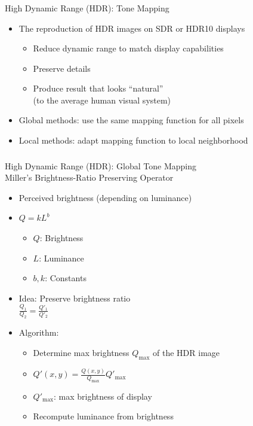 \documentclass[utf8,stillsansserifmath,fleqn,t]{beamer}
\begin{document}
\begin{frame}[label=tmo-0]
\frametitle{\insertsection}
High Dynamic Range (HDR): Tone Mapping
\begin{itemize}
\item The reproduction of HDR images on SDR or HDR10 displays
    \begin{itemize}
    \item Reduce dynamic range to match display capabilities
    \item Preserve details
    \item Produce result that looks ``natural''\\
        (to the average human visual system)
    \end{itemize}
\item Global methods: use the same mapping function for all pixels
\item Local methods: adapt mapping function to local neighborhood
\end{itemize}
\end{frame}

\begin{frame}
\frametitle{\insertsection}
High Dynamic Range (HDR): Global Tone Mapping\\[2ex]
Miller's Brightness-Ratio Preserving Operator
\begin{itemize}
\item Perceived brightness (depending on luminance)
\item $Q = kL^b$
    \begin{itemize}
    \item $Q$: Brightness
    \item $L$: Luminance
    \item $b,k$: Constants
    \end{itemize}
\item Idea: Preserve brightness ratio\\
    $\displaystyle \frac{Q_1}{Q_2} = \frac{Q'_1}{Q'_2}$
\item Algorithm:
    \begin{itemize}
    \item Determine max brightness $Q_{\max}$ of the HDR image
    \item $\displaystyle Q'(x,y) = \frac{Q(x,y)}{Q_{\max}} Q'_{\max}$
    \item $Q'_{\max}$: max brightness of display
    \item Recompute luminance from brightness
    \end{itemize}
\end{itemize}
\end{frame}
\end{document}
